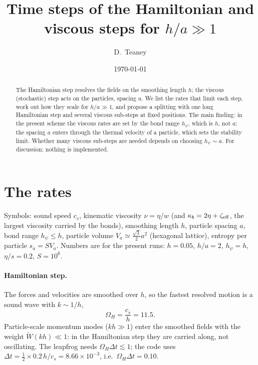 \documentclass[11pt,aps,preprint,nofootinbib,superscriptaddress,tightenlines]{revtex4-2}
\def\st{\begin{equation}}
\def\stp{\end{equation}}
\let\oldparagraph\paragraph
\renewcommand{\paragraph}{\par\bigskip\oldparagraph}
\begin{document}
\title{Time steps of the Hamiltonian and viscous steps for $h/a\gg1$}
\author{D.~Teaney}
\date{\today}

\begin{abstract}
The Hamiltonian step resolves the fields on the smoothing length $h$; the
viscous (stochastic) step acts on the particles, spacing $a$.  We list the rates
that limit each step, work out how they scale for $h/a\gg1$, and propose a
splitting with one long Hamiltonian step and several viscous sub-steps at fixed
positions.  The main finding: in the present scheme the viscous rates are set by
the bond range $h_\psi$, which is $h$, not $a$; the spacing $a$ enters through the
thermal velocity of a particle, which sets the stability limit.  Whether many
viscous sub-steps are needed depends on choosing $h_\psi\sim a$.  For discussion;
nothing is implemented.
\end{abstract}

\maketitle

\section{The rates}
\label{sec:rates}

Symbols: sound speed $c_s$, kinematic viscosity $\nu=\eta/w$ (and $\kappa_b=2\eta+\zeta_{\rm eff}$,
the largest viscosity carried by the bonds), smoothing length $h$, particle spacing
$a$, bond range $h_\psi\le h$, particle volume $V_a\simeq\frac{\sqrt3}{2}a^2$ (hexagonal lattice),
entropy per particle $s_a=SV_a$.  Numbers are for the present runs: $h=0.05$, $h/a=2$,
$h_\psi=h$, $\eta/s=0.2$, $S=10^6$.

\paragraph{Hamiltonian step.}  The forces and velocities are smoothed over $h$, so the
fastest resolved motion is a sound wave with $k\sim1/h$,
\st
\Omega_H=\frac{c_s}{h}=11.5 .
\stp
Particle-scale momentum modes ($kh\gg1$) enter the smoothed fields with the weight
$\tilde W(kh)\ll1$: in the Hamiltonian step they are carried along, not oscillating.
The leapfrog needs $\Omega_H\Delta t\lesssim1$; the code uses
$\Delta t=\tfrac12\times0.2\,h/c_s=8.66\times10^{-3}$, i.e.\ $\Omega_H\Delta t=0.10$.
\end{document}
